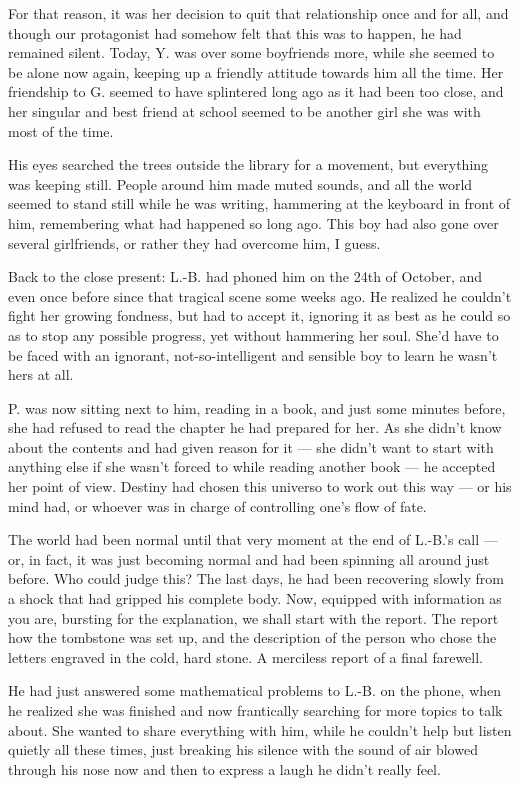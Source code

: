 For that reason, it was her decision to quit that relationship once and for all, and though our protagonist had somehow felt that this was to happen, he had remained silent. Today, Y. was over some boyfriends more, while she seemed to be alone now again, keeping up a friendly attitude towards him all the time. Her friendship to G. seemed to have splintered long ago as it had been too close, and her singular and best friend at school seemed to be another girl she was with most of the time.

His eyes searched the trees outside the library for a movement, but everything was keeping still. People around him made muted sounds, and all the world seemed to stand still while he was writing, hammering at the keyboard in front of him, remembering what had happened so long ago. This boy had also gone over several girlfriends, or rather they had overcome him, I guess.

Back to the close present: L.-B. had phoned him on the 24th of October, and even once before since that tragical scene some weeks ago. He realized he couldn't fight her growing fondness, but had to accept it, ignoring it as best as he could so as to stop any possible progress, yet without hammering her soul. She'd have to be faced with an ignorant, not-so-intelligent and sensible boy to learn he wasn't hers at all.

P. was now sitting next to him, reading in a book, and just some minutes before, she had refused to read the chapter he had prepared for her. As she didn't know about the contents and had given reason for it --- she didn't want to start with anything else if she wasn't forced to while reading another book --- he accepted her point of view. Destiny had chosen this universo to work out this way --- or his mind had, or whoever was in charge of controlling one's flow of fate.

The world had been normal until that very moment at the end of L.-B.'s call --- or, in fact, it was just becoming normal and had been spinning all around just before. Who could judge this? 
The last days, he had been recovering slowly from a shock that had gripped his complete body. Now, equipped with information as you are, bursting for the explanation, we shall start with the report. The report how the tombstone was set up, and the description of the person who chose the letters engraved in the cold, hard stone. A merciless report of a final farewell.

He had just answered some mathematical problems to L.-B. on the phone, when he realized she was finished and now frantically searching for more topics to talk about. She wanted to share everything with him, while he couldn't help but listen quietly all these times, just breaking his silence with the sound of air blowed through his nose now and then to express a laugh he didn't really feel.

